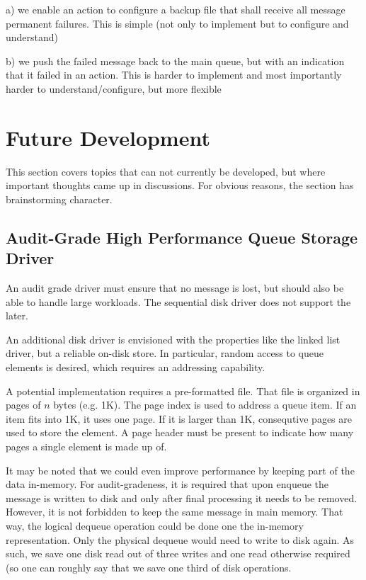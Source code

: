 \documentclass[a4paper,10pt]{article}
\begin{document}
a) we enable an action to configure a backup file that shall receive all
message permanent failures. This is simple (not only to implement but to
configure and understand)

b) we push the failed message back to the main queue, but with an indication
that it failed in an action. This is harder to implement and most importantly
harder to understand/configure, but more flexible

\section{Future Development}
This section covers topics that can not currently be developed, but where important thoughts came up in discussions. For obvious reasons, the section has brainstorming character.

\subsection{Audit-Grade High Performance Queue Storage Driver}
An audit grade driver must ensure that no message is lost, but should also be able to handle large workloads. The sequential disk driver does not support the later.

An additional disk driver is envisioned with the properties like the linked list driver, but a reliable on-disk store. In particular, random access to queue elements is desired, which requires an addressing capability.

A potential implementation requires a pre-formatted file. That file is organized in pages of $n$ bytes (e.g. 1K). The page index is used to address a queue item. If an item fits into 1K, it uses one page. If it is larger than 1K, consequtive pages are used to store the element. A page header must be present to indicate how many pages a single element is made up of.

It may be noted that we could even improve performance by keeping part of the data in-memory. For audit-gradeness, it is required that upon enqueue the message is written to disk and only after final processing it needs to be removed. However, it is not forbidden to keep the same message in main memory. That way, the logical dequeue operation could be done one the in-memory representation. Only the physical dequeue would need to write to disk again. As such, we save one disk read out of three writes and one read otherwise required (so one can roughly say that we save one third of disk operations.
\end{document}

